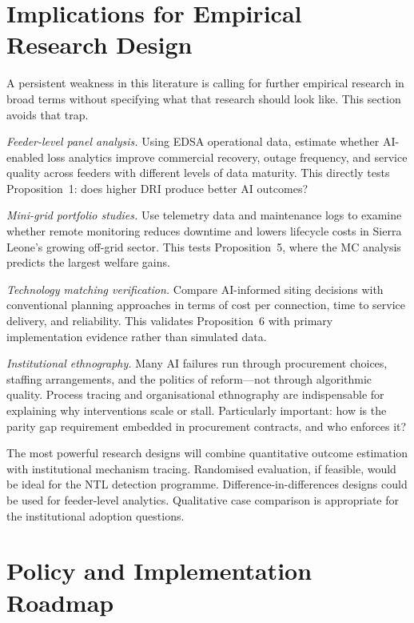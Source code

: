 \documentclass[preprint,12pt]{elsarticle}
\begin{document}
\section{Implications for Empirical Research Design}
\label{sec:design}

A persistent weakness in this literature is calling for
further empirical research in broad terms without specifying
what that research should look like. This section avoids
that trap.

\textit{Feeder-level panel analysis.} Using EDSA operational
data, estimate whether AI-enabled loss analytics improve
commercial recovery, outage frequency, and service quality
across feeders with different levels of data maturity.
This directly tests Proposition~1: does higher DRI produce
better AI outcomes?

\textit{Mini-grid portfolio studies.} Use telemetry data and
maintenance logs to examine whether remote monitoring reduces
downtime and lowers lifecycle costs in Sierra Leone's growing
off-grid sector. This tests Proposition~5, where the MC
analysis predicts the largest welfare gains.

\textit{Technology matching verification.} Compare AI-informed
siting decisions with conventional planning approaches
in terms of cost per connection, time to service delivery,
and reliability. This validates Proposition~6 with primary
implementation evidence rather than simulated data.

\textit{Institutional ethnography.} Many AI failures run
through procurement choices, staffing arrangements, and the
politics of reform---not through algorithmic quality.
Process tracing and organisational ethnography are
indispensable for explaining why interventions scale or
stall. Particularly important: how is the parity gap
requirement embedded in procurement contracts, and who
enforces it?

The most powerful research designs will combine quantitative
outcome estimation with institutional mechanism tracing.
Randomised evaluation, if feasible, would be ideal for
the NTL detection programme. Difference-in-differences
designs could be used for feeder-level analytics.
Qualitative case comparison is appropriate for the
institutional adoption questions.

\section{Policy and Implementation Roadmap}
\label{sec:roadmap}
\end{document}
